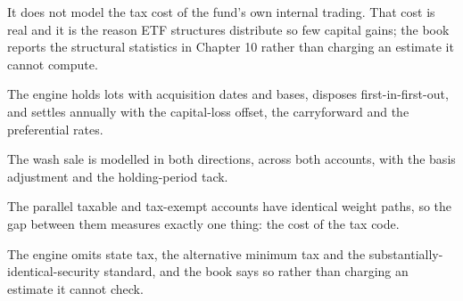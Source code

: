 It does not model the tax cost of the fund's own internal trading. That
cost is real and it is the reason ETF structures distribute so few capital
gains; the book reports the structural statistics in Chapter 10 rather
than charging an estimate it cannot compute.

\begin{keytakeaways}
\item The engine holds lots with acquisition dates and bases, disposes
first-in-first-out, and settles annually with the capital-loss offset,
the carryforward and the preferential rates.
\item The wash sale is modelled in both directions, across both accounts,
with the basis adjustment and the holding-period tack.
\item The parallel taxable and tax-exempt accounts have identical weight
paths, so the gap between them measures exactly one thing: the cost of
the tax code.
\item The engine omits state tax, the alternative minimum tax and the
substantially-identical-security standard, and the book says so rather
than charging an estimate it cannot check.
\end{keytakeaways}
